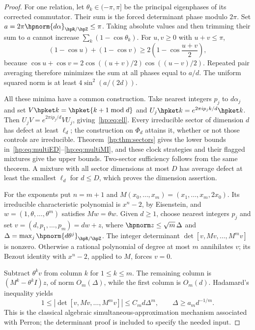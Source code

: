 \begin{proof}
For one relation, let $\theta_k\in(-\pi,\pi]$ be the principal eigenphases of its corrected commutator. Their sum is the forced determinant phase modulo $2\pi$. Set $a=2\pi\hpnorm{d\alpha}_{\hpR/\hpZ}\le\pi$. Taking absolute values and then trimming their sum to $a$ cannot increase $\sum_k(1-\cos\theta_k)$. For $u,v\ge0$ with $u+v\le\pi$,
\[
 (1-\cos u)+(1-\cos v)\ge2\left(1-\cos\frac{u+v}2\right),
\]
because $\cos u+\cos v=2\cos((u+v)/2)\cos((u-v)/2)$. Repeated pair averaging therefore minimizes the sum at all phases equal to $a/d$. The uniform squared norm is at least $4\sin^2(a/(2d))$.

All these minima have a common construction. Take nearest integers $p_j$ to $d\alpha_j$ and set $V\hpket k=\hpket{k+1\bmod d}$ and $U_j\hpket k=e^{2\pi ip_jk/d}\hpket k$. Then $U_jV=e^{2\pi ip_j/d}VU_j$, giving~\eqref{hp:eq:ell}. Every irreducible sector of dimension $d$ has defect at least $\ell_d$; the construction on $\Phi_d$ attains it, whether or not those controls are irreducible. Theorem~\ref{hp:thm:sectors} gives the lower bounds in~\eqref{hp:eq:multiED}--\eqref{hp:eq:multiMI}, and these clock strategies and their flagged mixtures give the upper bounds. Two-sector sufficiency follows from the same theorem. A mixture with all sector dimensions at most $D$ has average defect at least the smallest $\ell_d$ for $d\le D$, which proves the dimension assertion.

For the exponents put $n=m+1$ and $M(x_0,\ldots,x_m)=(x_1,\ldots,x_m,2x_0)$. Its irreducible characteristic polynomial is $x^n-2$, by Eisenstein, and $w=(1,\theta,\ldots,\theta^m)$ satisfies $Mw=\theta w$. Given $d\ge1$, choose nearest integers $p_j$ and set $v=(d,p_1,\ldots,p_m)=dw+z$, where $\hpnorm z\le\sqrt m\,\Delta$ and $\Delta=\max_j\hpnorm{d\theta^j}_{\hpR/\hpZ}$. The integer determinant $\det[v,Mv,\ldots,M^mv]$ is nonzero. Otherwise a rational polynomial of degree at most $m$ annihilates $v$; its Bezout identity with $x^n-2$, applied to $M$, forces $v=0$.

Subtract $\theta^kv$ from column $k$ for $1\le k\le m$. The remaining column is $(M^k-\theta^kI)z$, of norm $O_m(\Delta)$, while the first column is $O_m(d)$. Hadamard's inequality yields
\begin{equation}
 1\le|\det[v,Mv,\ldots,M^mv]|\le C_m d\Delta^m,
 \qquad \Delta\ge a_m d^{-1/m}.\label{hp:eq:perron}
\end{equation}
This is the classical algebraic simultaneous-approximation mechanism associated with Perron; the determinant proof is included to specify the needed input.


\end{proof}
